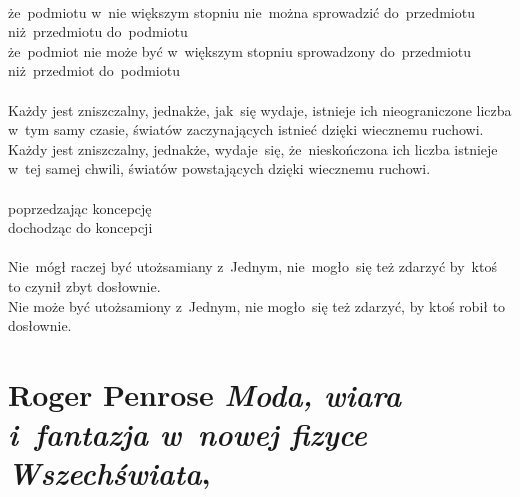\documentclass[a4paper,11pt]{article}
\numberwithin{equation}{section}
\begin{document}
\noindent
{} \\
\Jest że~podmiotu w~nie większym stopniu nie~można sprowadzić
do~przedmiotu niż~przedmiotu do~podmiotu \\
\PowinnoByc że~podmiot nie może być w~większym stopniu sprowadzony
do~przedmiotu niż~przedmiot do~podmiotu \\
 \\
\Jest Każdy jest zniszczalny, jednakże, jak~się wydaje, istnieje ich
nieograniczone liczba w~tym samy czasie, światów zaczynających istnieć
dzięki wiecznemu ruchowi. \\
\PowinnoByc Każdy jest zniszczalny, jednakże, wydaje~się, że~nieskończona
ich liczba istnieje w~tej samej chwili, światów powstających dzięki
wiecznemu ruchowi. \\
 \\
\Jest poprzedzając koncepcję \\
\PowinnoByc dochodząc do koncepcji \\
 \\
\Jest Nie~mógł raczej być utożsamiany z~Jednym, nie~mogło~się też
zdarzyć by~ktoś to czynił zbyt dosłownie. \\
\PowinnoByc Nie może być utożsamiony z~Jednym, nie mogło~się też zdarzyć, by
ktoś robił to dosłownie.


















\section{Roger Penrose \textit{Moda, wiara i~fantazja
    w~nowej fizyce Wszechświata},
  \parencite{PenroseModaWiaraIFantazja2017}}

\end{document}
